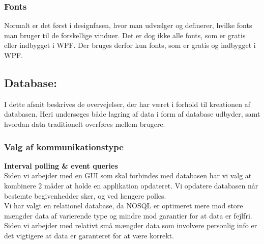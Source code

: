 \documentclass[a4paper,12pt,fleqn,oneside]{article}
\begin{document}
\subsubsection{Fonts}
Normalt er det først i designfasen, hvor man udvælger og definerer, hvilke fonts man bruger til de forskellige vinduer. Det er dog ikke alle fonts, som er gratis eller indbygget i WPF. Der bruges derfor kun fonts, som er gratis og indbygget i WPF. 

\subsection{Database:}
I dette afsnit beskrives de overvejelser, der har været i forhold til kreationen af databasen. Heri undersøges både lagring af data i form af database udbyder, samt hvordan data traditionelt overføres mellem brugere. 
\subsubsection{Valg af kommunikationstype}

\textbf{Interval polling \& event queries}\\
Siden vi arbejder med en GUI som skal forbindes med databasen har vi valg at kombinere 2 måder at holde en applikation opdateret. Vi opdatere databasen når bestemte begivenhedder sker, og ved længere  polles. \\
Vi har valgt en relationel database, da NOSQL er optimeret mere mod store mængder data af varierende type og mindre mod garantier for at data er fejlfri. Siden vi arbejder med relativt små mængder data som involvere personlig info er det vigtigere at data er garanteret for at være korrekt.

\printbibliography
\end{document}
